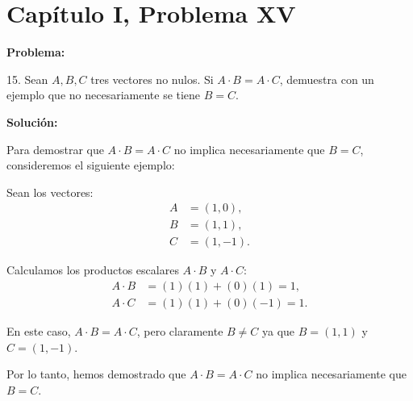 \section*{Capítulo I, Problema XV}

\textbf{Problema:}

15. Sean $A, B, C$ tres vectores no nulos. Si $A \cdot B = A \cdot C$, demuestra con un ejemplo que no necesariamente se tiene $B = C$.

\textbf{Solución:}

Para demostrar que $A \cdot B = A \cdot C$ no implica necesariamente que $B = C$, consideremos el siguiente ejemplo:

Sean los vectores:
\begin{align*}
    A &= (1, 0), \\
    B &= (1, 1), \\
    C &= (1, -1).
\end{align*}

Calculamos los productos escalares $A \cdot B$ y $A \cdot C$:
\begin{align*}
    A \cdot B &= (1)(1) + (0)(1) = 1, \\
    A \cdot C &= (1)(1) + (0)(-1) = 1.
\end{align*}

En este caso, $A \cdot B = A \cdot C$, pero claramente $B \neq C$ ya que $B = (1, 1)$ y $C = (1, -1)$.

Por lo tanto, hemos demostrado que $A \cdot B = A \cdot C$ no implica necesariamente que $B = C$.